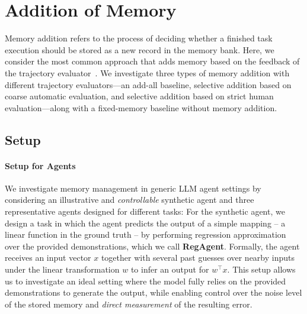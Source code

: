 \documentclass[11pt]{article}
\theoremstyle{plain}
\theoremstyle{definition}
\begin{document}
\section{Addition of Memory}
\label{sec:add}
Memory addition refers to the process of deciding whether a finished task execution should be stored as a new record in the memory bank. Here, we consider the most common approach that adds memory based on the feedback of the trajectory evaluator~\citep{wang2024agent,shi2024ehragent}. We investigate three types of memory addition with different trajectory evaluators—an add-all baseline, selective addition based on coarse automatic evaluation, and selective addition based on strict human evaluation—along with a fixed-memory baseline without memory addition. 
\subsection{Setup}
\label{sec:add_setup}

\paragraph{Setup for Agents} We investigate memory management in generic LLM agent settings by considering an illustrative and \textit{controllable} synthetic agent and three representative agents designed for different tasks:  
{For the synthetic agent, we design a task in which the agent predicts the output of a simple mapping -- a linear function in the ground truth -- by performing regression approximation over the provided demonstrations, which we call \textbf{RegAgent}. 
Formally, the agent receives an input vector $x$ together with several past guesses over nearby inputs under the linear transformation $w$ to infer an output for $w^{\top}x$.
This setup allows us to investigate an ideal setting where the model fully relies on the provided demonstrations to generate the output, while enabling control over the noise level of the stored memory and \textit{direct measurement} of the resulting error.}
\end{document}
